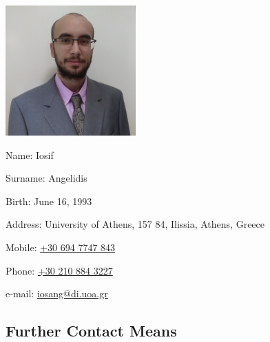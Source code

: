 \documentclass[a4paper,oneside,11pt]{article}
\begin{document}
\begin{multicols}{2} 
\includegraphics[width=5cm]{IMG_20190204_195706_ex.jpg}%
\columnbreak

\begin{flushright}
\textlatin{Name}: \textlatin{Iosif}

\textlatin{Surname}: \textlatin{Angelidis}

\textlatin{Birth}: \textlatin{June 16, 1993}

\textlatin{Address}: \textlatin{University of Athens, 157 84, Ilissia, Athens, Greece}

\textlatin{Mobile}: \textlatin{\href{tel:306947747843}{+30 694 7747 843}}

\textlatin{Phone}: \textlatin{\href{tel:302108843227}{+30 210 884 3227}}

\textlatin{e-mail}: \textlatin{\href{mailto:iosang@di.uoa.gr}{iosang@di.uoa.gr}}

\end{flushright}

\end{multicols}

\subsection*{Further Contact Means}
\end{document}
